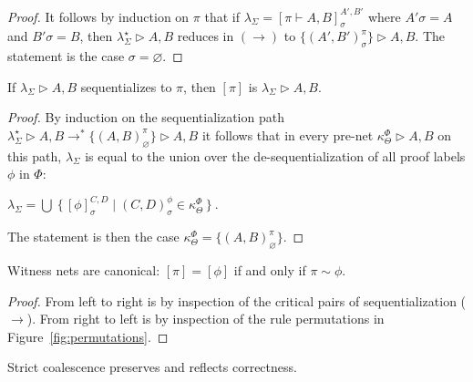 \documentclass[a4paper,UKenglish]{lipics-v2019}
\newcommand\+{+}
\renewcommand\*{\times}
\newcommand\prf[3]{#1\vdash\!#2,#3}
\newcommand\net[3]{#1\triangleright #2,#3}
\newcommand\deseq[4][\sigma]{[#2]_{#1}^{#3,#4}}
\newcommand\link[3][\sigma]{(#2,#3)_{#1}}
\newcommand\scoal{\rightarrow} %
\begin{document}
\begin{proof}
It follows by induction on $\pi$ that if $\lambda_\Sigma=\deseq{\prf\pi AB}{A'}{B'}$ where $A'\sigma=A$ and $B'\sigma=B$, then $\net{\lambda^\star_\Sigma}AB$ reduces in $(\scoal)$ to $\net{\{\link{A'}{B'}^\pi\}}AB$. The statement is the case $\sigma=\varnothing$.
\end{proof}

\addtocounter{retheorem}{-1}
\begin{retheorem}
If $\net{\lambda_\Sigma}AB$ sequentializes to $\pi$, then $[\pi]$ is $\net{\lambda_\Sigma}AB$. 
\end{retheorem}

\begin{proof}
By induction on the sequentialization path 
$\net{\lambda_\Sigma^\star}AB\scoal^*\net{\{\link[\varnothing]AB^\pi\}}AB$
it follows that in every pre-net $\net{\kappa_\Theta^\Phi}AB$ on this path, $\lambda_\Sigma$ is equal to the union over the de-sequentialization of all proof labels $\phi$ in $\Phi$:
\begin{center}\(
	\lambda_\Sigma=\bigcup~\{\,\deseq\phi CD \mid \link CD^\phi \in \kappa_\Theta^\Phi\,\}~.
\)\end{center}
The statement is then the case $\kappa_\Theta^\Phi=\{\link[\varnothing]AB^\pi\}$.
\end{proof}

\addtocounter{retheorem}{-1}
\begin{retheorem}
Witness nets are canonical: $[\pi]=[\phi]$ if and only if $\pi\sim\phi$.
\end{retheorem}

\begin{proof}
From left to right is by inspection of the critical pairs of sequentialization ($\scoal$). From right to left is by inspection of the rule permutations in Figure~\ref{fig:permutations}.
\end{proof}

\begin{lemma}
\label{lem:correct}
Strict coalescence preserves and reflects correctness.
\end{lemma}
\end{document}

